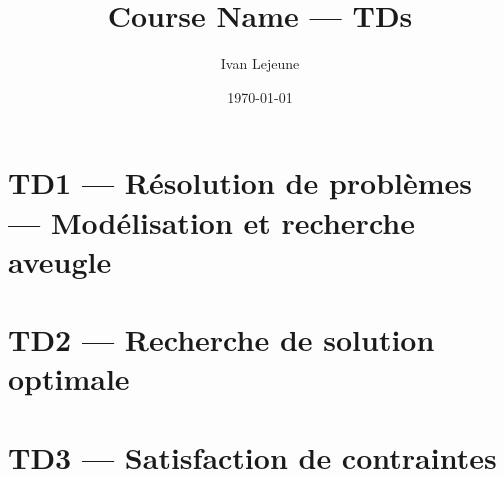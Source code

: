\documentclass[french,a4paper,10pt]{article}
\title{\color{astral} \sffamily \bfseries Course Name --- TDs}
\author{Ivan Lejeune}
\date{\today}
\begin{document}
    \maketitle
    \tableofcontents

    \newpage
    \section*{TD1 --- Résolution de problèmes --- Modélisation et recherche aveugle}\label{sec:TD1}
    \setcounter{section}{1}
    \setcounter{tdcounter}{0}
    

    \newpage
    \section*{TD2 --- Recherche de solution optimale}\label{sec:TD2}
    \setcounter{section}{2}
    \setcounter{tdcounter}{0}
    

    \newpage
    \section*{TD3 --- Satisfaction de contraintes}\label{sec:TD3}
    \setcounter{section}{3}
    \setcounter{tdcounter}{0}
    
\end{document}
